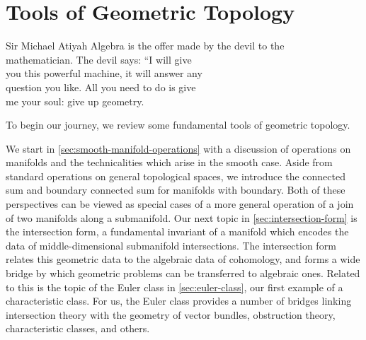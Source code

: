 \chapter{Tools of Geometric Topology}\label{chap:fundamentals}

%
%

\begin{epigraph}{20em}{Sir Michael Atiyah}
	Algebra is the offer made by the devil to the \\
	mathematician. The devil says: ``I will give \\
	you this powerful machine, it will answer any \\
	question you like. All you need to do is give\\
	me your soul: give up geometry.
\end{epigraph}

\noindent
To begin our journey, we review some fundamental tools of geometric topology.

We start in \cref{sec:smooth-manifold-operations} with a discussion of operations on manifolds and the technicalities which arise in the smooth case. Aside from standard operations on general topological spaces, we introduce the connected sum and boundary connected sum for manifolds with boundary. Both of these perspectives can be viewed as special cases of a more general operation of a join of two manifolds along a submanifold. Our next topic in \cref{sec:intersection-form} is the intersection form, a fundamental invariant of a manifold which encodes the data of middle-dimensional submanifold intersections. The intersection form relates this geometric data to the algebraic data of cohomology, and forms a wide bridge by which geometric problems can be transferred to algebraic ones. Related to this is the topic of the Euler class in \cref{sec:euler-class}, our first example of a characteristic class. For us, the Euler class provides a number of bridges linking intersection theory with the geometry of vector bundles, obstruction theory, characteristic classes, and others.

